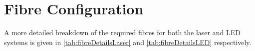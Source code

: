\documentclass[a4paper,11pt]{article}
\providecommand{\DIFdelbeginFL}{} %
\newcommand{\DIFscaledelfig}{0.5}
\newlength{\DIFdelgraphicswidth} %
\newlength{\DIFdelgraphicsheight} %
\newcommand{\DIFdelincludegraphics}[2][]{%
\sbox{\DIFdelgraphicsbox}{\DIFOincludegraphics[#1]{#2}}%
\settoboxwidth{\DIFdelgraphicswidth}{\DIFdelgraphicsbox} %
\settoboxtotalheight{\DIFdelgraphicsheight}{\DIFdelgraphicsbox} %
\scalebox{\DIFscaledelfig}{%
\parbox[b]{\DIFdelgraphicswidth}{\usebox{\DIFdelgraphicsbox}\\[-\baselineskip] \rule{\DIFdelgraphicswidth}{0em}}\llap{\resizebox{\DIFdelgraphicswidth}{\DIFdelgraphicsheight}{%
\setlength{\unitlength}{\DIFdelgraphicswidth}%
\begin{picture}(1,1)%
\thicklines\linethickness{2pt} %
{\color[rgb]{1,0,0}\put(0,0){\framebox(1,1){}}}%
{\color[rgb]{1,0,0}\put(0,0){\line( 1,1){1}}}%
{\color[rgb]{1,0,0}\put(0,1){\line(1,-1){1}}}%
\end{picture}%
}\hspace*{3pt}}} %
} %
\DeclareRobustCommand{\DIFdelbeginFL}{\DIFOdelbeginFL \let\includegraphics\DIFdelincludegraphics} %
\begin{document}
\clearpage
\newpage

\section{Fibre Configuration}\label{app:fibreconfig}

A more detailed breakdown of the required fibres for both the laser and LED systems is given in \cref{tab:fibreDetailsLaser} and \cref{tab:fibreDetailsLED} respectively.

\begin{table}[h]
\centering
\setlength{\tabcolsep}{4pt}
\DIFdelbeginFL %

\end{table}
\end{document}
